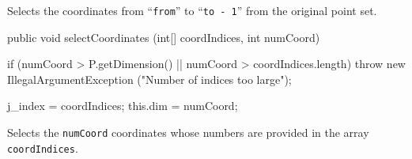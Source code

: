  \begin{tabb}
   Selects the coordinates from ``\texttt{from}'' to ``\texttt{to - 1}'' from the
   original point set.
 \end{tabb}
\begin{htmlonly}
\end{htmlonly}
\begin{code}

   public void selectCoordinates (int[] coordIndices, int numCoord) \begin{hide} {
      if (numCoord > P.getDimension() || numCoord > coordIndices.length)
         throw new IllegalArgumentException ("Number of indices too large");

      j_index = coordIndices;
      this.dim = numCoord;
   }\end{hide}
\end{code}
 \begin{tabb}
   Selects the \texttt{numCoord} coordinates whose numbers are provided in
   the array \texttt{coordIndices}.
 \end{tabb}
\begin{htmlonly}
\end{htmlonly}
